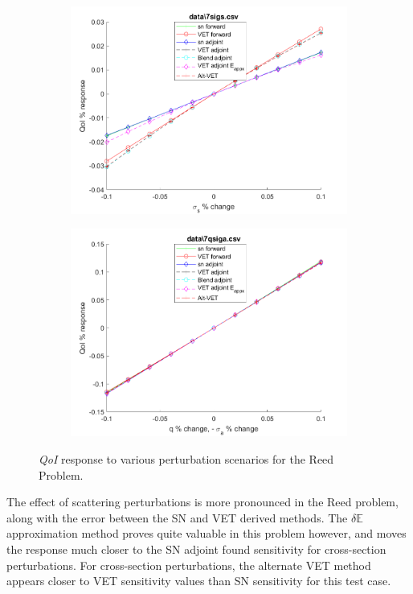 \documentclass[12pt]{report}
\newcommand{\Edd}{\mathbb{E}}
\newcommand{\qoi}{{\it QoI}\xspace}
\begin{document}
\begin{figure}[H]
\begin{subfigure}{.5\textwidth}
  \includegraphics[width=.98\linewidth]{figures2/7sigsSens.png}
  \label{T4:sfig3}
\end{subfigure}%
\begin{subfigure}{.5\textwidth}
  \centering
  \includegraphics[width=.98\linewidth]{figures2/7qsigaSens.png}
  \label{T4:sfig4}
\end{subfigure}
\caption{\qoi response to various perturbation scenarios for the Reed Problem.}
\end{figure}

The effect of scattering perturbations is more pronounced in the Reed problem, along with the error between the SN and VET derived methods. The $\delta \Edd$ approximation method proves quite valuable in this problem however, and moves the response much closer to the SN adjoint found sensitivity for cross-section perturbations. For cross-section perturbations, the alternate VET method appears closer to VET sensitivity values than SN sensitivity for this test case.
\end{document}
